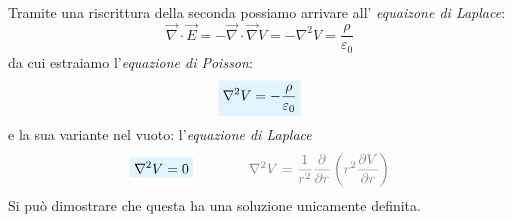 \documentclass[x11names]{report}
\newcommand*{\QEDB}{\null\nobreak\hfill\ensuremath{\square}}%
\newcommand{\dimostrazione}[2]{
	\begin{dym}{dimostrazione#1}
		#2
		\QEDB
	\end{dym}
}
\newcommand{\viola}[1]{%
	\colorbox{myblue}{$\displaystyle #1$}
}
\begin{document}
Tramite una riscrittura della seconda possiamo arrivare all' \textit{equaizone di Laplace}:
\[
\vec{\nabla} \cdot \vec{E} = - \vec{\nabla} \cdot \vec{\nabla}V = - \nabla^2V = \frac{\rho}{\varepsilon_0}
\]
da cui estraiamo l'\textit{equazione di Poisson}:
\begin{equation}
	\viola{\nabla^2V = -\frac{\rho}{\varepsilon_0} }
\end{equation}
e la sua variante nel vuoto: l'\textit{equazione di Laplace}
\begin{equation}
	\viola{\nabla^2V = 0} \qquad\qquad \textcolor{gray}{\nabla^2V = \frac{1}{r^2}\frac{\partial}{\partial r}\left(r^2\frac{\partial V}{\partial r}\right) }
\end{equation}
Si può dimostrare che questa ha una soluzione unicamente definita.
\newpage
\end{document}
